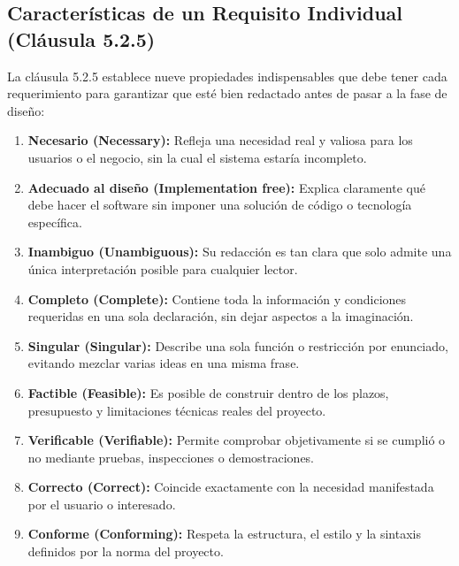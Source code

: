 \documentclass[11pt, a4paper]{article}
\begin{document}
\subsection{Características de un Requisito Individual (Cláusula 5.2.5)}
La cláusula 5.2.5 \cite{iso29148} establece nueve propiedades indispensables que debe tener cada requerimiento para garantizar que esté bien redactado antes de pasar a la fase de diseño:
\begin{enumerate}
    \item \textbf{Necesario (Necessary):} Refleja una necesidad real y valiosa para los usuarios o el negocio, sin la cual el sistema estaría incompleto.
    \item \textbf{Adecuado al diseño (Implementation free):} Explica claramente qué debe hacer el software sin imponer una solución de código o tecnología específica.
    \item \textbf{Inambiguo (Unambiguous):} Su redacción es tan clara que solo admite una única interpretación posible para cualquier lector.
    \item \textbf{Completo (Complete):} Contiene toda la información y condiciones requeridas en una sola declaración, sin dejar aspectos a la imaginación.
    \item \textbf{Singular (Singular):} Describe una sola función o restricción por enunciado, evitando mezclar varias ideas en una misma frase.
    \item \textbf{Factible (Feasible):} Es posible de construir dentro de los plazos, presupuesto y limitaciones técnicas reales del proyecto.
    \item \textbf{Verificable (Verifiable):} Permite comprobar objetivamente si se cumplió o no mediante pruebas, inspecciones o demostraciones.
    \item \textbf{Correcto (Correct):} Coincide exactamente con la necesidad manifestada por el usuario o interesado.
    \item \textbf{Conforme (Conforming):} Respeta la estructura, el estilo y la sintaxis definidos por la norma del proyecto.
\end{enumerate}
\end{document}
